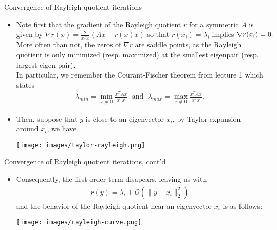 \documentclass[t,usepdftitle=false]{beamer}
\begin{document}
\begin{frame}{Convergence of Rayleigh quotient iterations}
\begin{itemize}
\item Note first that the gradient of the Rayleigh quotient $r$ for a symmetric $A$ is given by $\nabla r(x)=\frac{2}{x^Tx}(Ax-r(x)x)$ so that $r(x_i)=\lambda_i$ implies $\nabla r(x_i)=0.\hspace{-1cm}$\vspace{.1cm}\\
More often than not, the zeros of $\nabla r$ are saddle points, as the Rayleigh quotient is only minimized (resp. maximized) at the smallest eigenpair (resp. largest eigen-pair).\vspace{.1cm}\\
In particular, we remember the Courant-Fischer theorem from lecture 1 which states\vspace{-.25cm}
\begin{align*}
\lambda_{min}=\min_{x\neq 0}\frac{x^TAx}{x^Tx}
\;\text{ and }\;
\lambda_{max}=\max_{x\neq 0}\frac{x^TAx}{x^Tx}.
\end{align*}
\item Then, suppose that $y$ is close to an eigenvector $x_i$, by Taylor expansion around $x_i$, we have\vspace{.2cm}
\begin{center}
\texttt{[image: images/taylor-rayleigh.png]}\vspace{.2cm}
\end{center}
\end{itemize}
\end{frame}

\begin{frame}{Convergence of Rayleigh quotient iterations, cont'd}
\begin{itemize}
\item[]Consequently, the first order term disapears, leaving us with
\begin{align*}
r(y)=\lambda_i+\mathcal{O}(\|y-x_i\|_2^2)
\end{align*}
and the behavior of the Rayleigh quotient near an eigenvector $x_i$ is as follows:\vspace{.2cm}
\begin{center}
\texttt{[image: images/rayleigh-curve.png]}\vspace{.2cm}
\end{center}
\end{itemize}
\end{frame}
\end{document}
